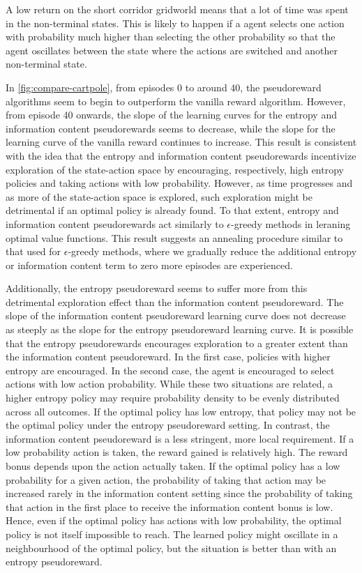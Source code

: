 \documentclass{article}
\begin{document}
  A low return on the short corridor gridworld means that a lot of time was spent in the non-terminal states. This is likely to happen if a agent selects one action with probability much higher than selecting the other probability so that the agent oscillates between the state where the actions are switched and another non-terminal state. 

  In \ref{fig:compare-cartpole}, from episodes 0 to around 40, the pseudoreward algorithms seem to begin to outperform the vanilla reward algorithm. However, from episode 40 onwards, the slope of the learning curves for the entropy and information content pseudorewards seems to decrease, while the slope for the learning curve of the vanilla reward continues to increase. This result is consistent with the idea that the entropy and information content pseudorewards incentivize exploration of the state-action space by encouraging, respectively, high entropy policies and taking actions with low probability. However, as time progresses and as more of the state-action space is explored, such exploration might be detrimental if an optimal policy is already found. To that extent, entropy and information content pseudorewards act similarly to $\epsilon$-greedy methods in leraning optimal value functions. This result suggests an annealing procedure similar to that used for $\epsilon$-greedy methods, where we gradually reduce the additional entropy or information content term to zero more episodes are experienced.

  Additionally, the entropy pseudoreward seems to suffer more from this detrimental exploration effect than the information content pseudoreward. The slope of the information content pseudoreward learning curve does not decrease as steeply as the slope for the entropy pseudoreward learning curve. It is possible that the entropy pseudorewards encourages exploration to a greater extent than the information content pseudoreward. In the first case, policies with higher entropy are encouraged. In the second case, the agent is encouraged to select actions with low action probability. While these two situations are related, a higher entropy policy may require probability density to be evenly distributed across all outcomes. If the optimal policy has low entropy, that policy may not be the optimal policy under the entropy pseudoreward setting. In contrast, the information content pseudoreward is a less stringent, more local requirement. If a low probability action is taken, the reward gained is relatively high. The reward bonus depends upon the action actually taken. If the optimal policy has a low probability for a given action, the probability of taking that action may be increased rarely in the information content setting since the probability of taking that action in the first place to receive the information content bonus is low. Hence, even if the optimal policy has actions with low probability, the optimal policy is not itself impossible to reach. The learned policy might oscillate in a neighbourhood of the optimal policy, but the situation is better than with an entropy pseudoreward.
\end{document}
